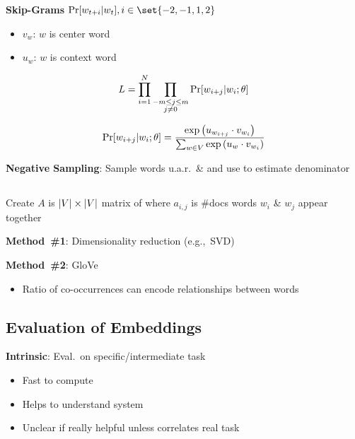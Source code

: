 \documentclass[9pt]{extarticle}
\renewcommand{\green}[1]{{\color{ForestGreen} #1}}
\begin{document}
\begin{multicols}{3}
  \textbf{\green{Skip-Grams}} ${\Pr\sbrack{w_{t+i} \vert w_{t}}, i \in \set{-2,-1,1,2}}$
  \begin{itemize}
    \item $v_w$: $w$ is center word
    \item $u_w$: $w$ is context word
  \end{itemize}

  \begin{equation*}
    L = \prod_{i=1}^{N} \prod_{\substack{-m \leq j \leq m \\ j \ne 0}} \Pr\lbrack w_{i+j} \vert w_{i} ; \theta\rbrack
  \end{equation*}

  \begin{equation*}
    \Pr\lbrack w_{i+j} \vert w_{i} ; \theta\rbrack = \frac{\exp\left(u_{w_{i+j}} \cdot v_{w_i} \right)}{\sum_{w \in V} \exp\left(u_{w} \cdot v_{w_i} \right)}
  \end{equation*}

  \green{\textbf{Negative Sampling}}: Sample words u.a.r.\ \& and use to estimate denominator

  \subsection*{}

  Create $A$ is ${\lvert V\rvert \times \lvert V\rvert}$ matrix of where $a_{i,j}$ is \#docs words $w_i$ \& $w_j$ appear together

  \green{\textbf{Method~\#1}}: Dimensionality reduction (e.g.,~SVD)

  \green{\textbf{Method~\#2}}: GloVe
  \begin{itemize}
    \item Ratio of co-occurrences can encode relationships between words
  \end{itemize}

  \subsection*{Evaluation of Embeddings}

  \textbf{\green{Intrinsic}}: Eval.\ on specific/intermediate task
  \begin{itemize}
    \item Fast to compute
    \item Helps to understand system
    \item Unclear if really helpful unless correlates real task
  \end{itemize}


\end{multicols}
\end{document}
